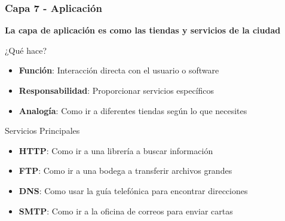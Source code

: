 \documentclass[aspectratio=169]{beamer}
\begin{document}
            \begin{frame}
            \frametitle{Capa 7 - Aplicación}
            
            \begin{center}
            \Large \textbf{La capa de aplicación es como las tiendas y servicios de la ciudad}
            \end{center}
          
            \begin{block}{¿Qué hace?}
            \begin{itemize}
            \item \textbf{Función}: Interacción directa con el usuario o software
            \item \textbf{Responsabilidad}: Proporcionar servicios específicos
            \item \textbf{Analogía}: Como ir a diferentes tiendas según lo que necesites
            \end{itemize}
            \end{block}
            
            \begin{block}{Servicios Principales}
            \begin{itemize}
            \item \textbf{HTTP}: Como ir a una librería a buscar información
            \item \textbf{FTP}: Como ir a una bodega a transferir archivos grandes
            \item \textbf{DNS}: Como usar la guía telefónica para encontrar direcciones
            \item \textbf{SMTP}: Como ir a la oficina de correos para enviar cartas
            \end{itemize}
            \end{block}
            
            \end{frame}
\end{document}
